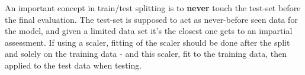 An important concept in train/test splitting is to \textbf{never} touch the test-set before the final evaluation. The test-set is supposed to act as never-before seen data for the model, and given a limited data set it's the closest one gets to an impartial assessment. 
If using a scaler, fitting of the scaler should be done after the split and solely on the training data - and this scaler, fit to the training data, then applied to the test data when testing. 









